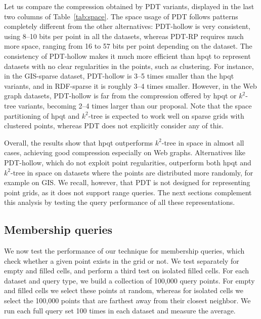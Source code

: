 \documentclass{elsarticle}
\newcommand{\kt}{$k^2$-tree\xspace}
\newcommand{\giss}{\textsf{GIS-sparse}\xspace}
\newcommand{\rdfs}{\textsf{RDF-sparse}\xspace}
\newcommand{\hpqt}{\textsf{hpqt}\xspace}
\newcommand{\pdt}{PDT\xspace}
\newcommand{\pdth}{PDT-hollow\xspace}
\newcommand{\pdtrp}{PDT-RP\xspace}
\begin{document}
Let us compare the compression obtained by \pdt variants, displayed in the last two columns of Table~\ref{tab:space}. The space usage of \pdt follows patterns completely different from the other alternatives: \pdth is very consistent, using 8--10 bits per point in all the datasets, whereas \pdtrp requires much more space, ranging from 16 to 57 bits per point depending on the dataset. The consistency of \pdth makes it much more efficient than \hpqt to represent datasets with no clear regularities in the points, such as clustering. For instance, in the \giss dataset, \pdth is 3--5 times smaller than the \hpqt variants, and in \rdfs it is roughly 3--4 times smaller. However, in the Web graph datasets, \pdth is far from the compression offered by \hpqt or \kt variants, becoming 2--4 times larger than our proposal. Note that the space partitioning of \hpqt and \kt is expected to work well on sparse grids with clustered points, whereas \pdt does not explicitly consider any of this. 
 
 
Overall, the results show that \hpqt outperforms \kt in space in almost all cases, achieving good compression especially on Web graphs. Alternatives like \pdth, which do not exploit point regularities, outperform both \hpqt and \kt in space on datasets where the points are distributed more randomly, for example on GIS. We recall, however, that \pdt is not designed for representing point grids, as it does not support range queries. The next sections complement this analysis by testing the query performance of all these representations.

\subsection{Membership queries}

We now test the performance of our technique for membership queries, which check whether a given point exists in the grid or not. We test separately for empty and filled cells, and perform a third test on isolated filled cells. For each dataset and query type, we build a collection of 100,000 query points. For empty and filled cells we select these points at random, whereas for isolated cells we select the 100,000 points that are farthest away from their closest neighbor. We run each full query set 100 times in each dataset and measure the average.
\end{document}
